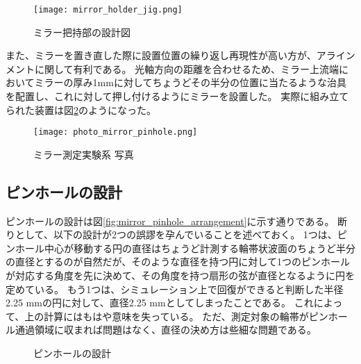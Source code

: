 \begin{figure}[!ht]
\centering
\texttt{[image: mirror\_holder\_jig.png]}
\caption{ミラー把持部の設計図}
\label{fig:mirror_holder_jig}
\end{figure}

また、ミラーを置き直した際に設置位置の繰り返し再現性が高い方が、アラインメントに関して有利である。
光軸方向の距離を合わせるため、ミラー上流端においてミラーの厚み1mmに対してちょうどその半分の位置に当たるような治具を配置し、これに対して押し付けるようにミラーを設置した。
実際に組み立てられた装置は図\ref{fig:photo_mirror_experiment_mirror_and_pinhole}のようになった。

\begin{figure}[!ht]
\centering
\texttt{[image: photo\_mirror\_pinhole.png]}
\caption{ミラー測定実験系 写真}
\label{fig:photo_mirror_experiment_mirror_and_pinhole}
\end{figure}


\subsection{ピンホールの設計}

ピンホールの設計は図\ref{fig:mirror_pinhole_arrangement}に示す通りである。
断りとして、以下の設計が2つの誤謬を孕んでいることを述べておく。
1つは、ピンホール中心が移動する円の直径はちょうど計測する輪帯状波面のちょうど半分の直径とするのが自然だが、そのような直径を持つ円に対して1つのピンホールが対応する角度を先に決めて、その角度を持つ扇形の弦が直径となるように円を定めている。
もう1つは、シミュレーション上で回復ができると判断した半径2.25 mmの円に対して、直径2.25 mmとしてしまったことである。
これによって、上の計算にはもはや意味を失っている。
ただ、測定対象の輪帯がピンホール通過領域に収まれば問題はなく、直径の決め方は些細な問題である。

\begin{figure}[!ht]
\centering

\caption[]{ピンホールの設計}
\label{fig:pinhole_arrangement_pictures}
\end{figure}


\clearpage
\newpage

